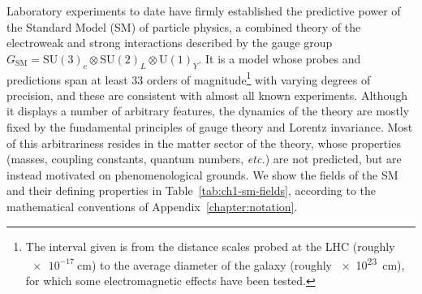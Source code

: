 Laboratory experiments to date have firmly established the predictive power of
the Standard Model (SM) of particle physics, a combined theory of the
electroweak and strong interactions described by the gauge group
$G_{\text{SM}} = \mathrm{SU}(3)_{c} \otimes \mathrm{SU}(2)_{L} \otimes \mathrm{U}(1)_{Y}$.
It is a model whose probes and predictions span at least 33 orders of
magnitude\footnote{The interval given is from the distance scales probed at the
  LHC (roughly $\SI{e-17}{\cm}$) to the average diameter of the galaxy (roughly
  \SI{e23}{\cm}), for which some electromagnetic effects have been tested.} with
varying degrees of precision, and these are consistent with almost all known
experiments. Although it displays a number of arbitrary features, the dynamics
of the theory are mostly fixed by the fundamental principles of gauge theory and
Lorentz invariance. Most of this arbitrariness resides in the matter sector of
the theory, whose properties (masses, coupling constants, quantum numbers,
\textit{etc.}) are not predicted, but are instead motivated on phenomenological
grounds. We show the fields of the SM and their defining properties in
Table~\ref{tab:ch1-sm-fields}, according to the mathematical conventions of
Appendix~\ref{chapter:notation}.

